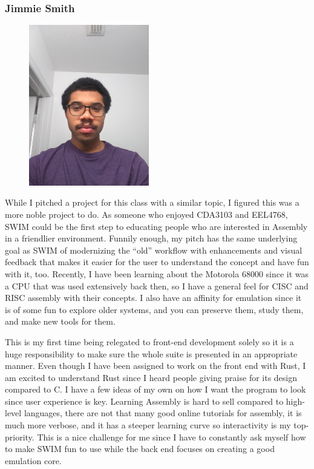 \documentclass[
    paper=letter,
    parskip=half,
    fontsize=12pt,
    titlepage=firstiscover,
    toc=bibliography,
    numbers=endperiod
]{scrartcl}
\begin{document}
\subsubsection{Jimmie Smith}
\begin{figure}[H]
    \includegraphics[height=7cm]{profile-jimmie}
\end{figure}

While I pitched a project for this class with a similar topic, I figured this was a more noble project to do. As someone who enjoyed CDA3103 and EEL4768, SWIM could be the first step to educating people who are interested in Assembly in a friendlier environment. Funnily enough, my pitch has the same underlying goal as SWIM of modernizing the “old” workflow with enhancements and visual feedback that makes it easier for the user to understand the concept and have fun with it, too. Recently, I have been learning about the Motorola 68000 since it was a CPU that was used extensively back then, so I have a general feel for CISC and RISC assembly with their concepts. I also have an affinity for emulation since it is of some fun to explore older systems, and you can preserve them, study them, and make new tools for them.

This is my first time being relegated to front-end development solely so it is a huge responsibility to make sure the whole suite is presented in an appropriate manner. Even though I have been assigned to work on the front end with Rust, I am excited to understand Rust since I heard people giving praise for its design compared to C. I have a few ideas of my own on how I want the program to look since user experience is key. Learning Assembly is hard to sell compared to high-level languages, there are not that many good online tutorials for assembly, it is much more verbose, and it has a steeper learning curve so interactivity is my top-priority. This is a nice challenge for me since I have to constantly ask myself how to make SWIM fun to use while the back end focuses on creating a good emulation core.
\end{document}
